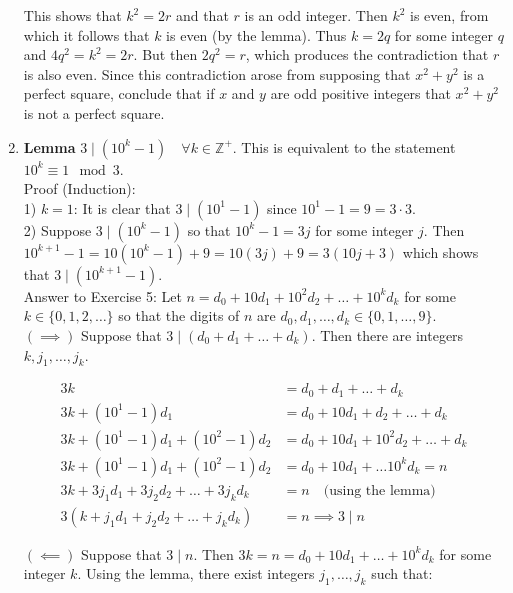 \documentclass[a4paper]{article}
\begin{document}
\begin{enumerate}
This shows that $k^2 = 2r$ and that $r$ is an odd integer. Then $k^2$ is even, from which it follows that $k$ is even (by the lemma). Thus $k = 2q$ for some integer $q$ and $4q^2 = k^2 = 2r$. But then $2q^2 = r$, which produces the contradiction that $r$ is also even. Since this contradiction arose from supposing that $x^2 + y^2$ is a perfect square, conclude that if $x$ and $y$ are odd positive integers that $x^2 + y^2$ is not a perfect square. 


\item

\textbf{Lemma} $3 \mid (10^k - 1) \quad \forall k \in \mathbb{Z}^+$. This is equivalent to the statement $10^k \equiv 1 \mod 3$.\\


Proof (Induction): \\
1) $k = 1$: It is clear that $3 \mid (10^1 - 1)$ since $10^1 - 1 = 9 = 3 \cdot 3$. \\
2) Suppose $3 \mid (10^k - 1)$ so that $10^k - 1 = 3j$ for some integer $j$. Then $10^{k+1} - 1 = 10(10^k - 1) + 9 = 10(3j) + 9 = 3(10j + 3)$ which shows that $3 \mid (10^{k+1} - 1)$.\\

Answer to Exercise 5: Let $n = d_0 + 10d_1 + 10^2d_2 + \dots + 10^kd_k$ for some $k \in \{0,1,2, \dots\}$ so that the digits of $n$ are $d_0, d_1,\dots , d_k \in \{0,1,\dots,9\}$. \\

$(\implies)$ Suppose that $3 \mid (d_0 + d_1 + \dots + d_k)$. Then there are integers $k, j_1, \dots , j_k$. 

\begin{align*}
3k &= d_0 + d_1 + \dots + d_k \\
3k + (10^1 - 1)d_1 &= d_0 + 10d_1 + d_2 + \dots + d_k \\
3k + (10^1 - 1)d_1 + (10^2 - 1)d_2 &= d_0 + 10d_1 + 10^2 d_2 + \dots + d_k\\
3k + (10^1 - 1)d_1 + (10^2 - 1)d_2 &= d_0 + 10d_1 + \dots 10^kd_k = n \\
3k + 3j_1d_1 + 3j_2d_2 + \dots + 3j_kd_k &= n \quad \text{(using the lemma)} \\
3(k + j_1d_1 + j_2d_2 + \dots + j_kd_k) &= n \implies 3 \mid n
\end{align*}

$(\impliedby)$ Suppose that $3 \mid n$. Then $3k = n = d_0 + 10d_1 + \dots + 10^kd_k$ for some integer $k$. Using the lemma, there exist integers $j_1, \dots , j_k$ such that: \\


\end{enumerate}
\end{document}
